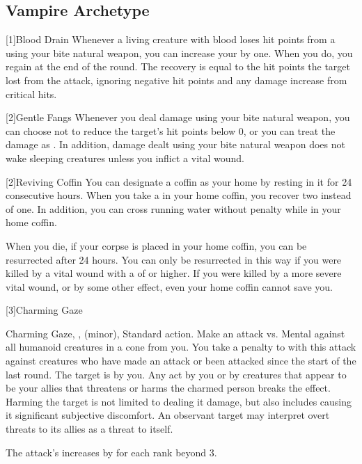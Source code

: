   \subsection{Vampire Archetype}

    [1]{Blood Drain} Whenever a living creature with blood loses hit points from a  using your bite natural weapon, you can increase your  by one.
      When you do, you regain  at the end of the round.
      The recovery is equal to the hit points the target lost from the attack, ignoring negative hit points and any damage increase from critical hits.

    [2]{Gentle Fangs} Whenever you deal damage using your bite natural weapon, you can choose not to reduce the target's hit points below 0, or you can treat the damage as .
      In addition, damage dealt using your bite natural weapon does not wake sleeping creatures unless you inflict a vital wound.

    [2]{Reviving Coffin} You can designate a coffin as your home by resting in it for 24 consecutive hours.
      When you take a  in your home coffin, you recover two  instead of one.
      In addition, you can cross running water without penalty while in your home coffin.

      When you die, if your corpse is placed in your home coffin, you can be resurrected after 24 hours.
      You can only be resurrected in this way if you were killed by a vital wound with a  of  or higher.
      If you were killed by a more severe vital wound, or by some other effect, even your home coffin cannot save you.

    [3]{Charming Gaze}
      \begin{magicalsustainability}{Charming Gaze}{, ,  (minor), }
        \abilityusagetime Standard action.
        \rankline
        Make an attack vs. Mental against all humanoid creatures in a \medarea cone from you.
        You take a  penalty to  with this attack against creatures who have made an attack or been attacked since the start of the last round.
        \hit The target is \charmed by you.
        Any act by you or by creatures that appear to be your allies that threatens or harms the charmed person breaks the effect.
        Harming the target is not limited to dealing it damage, but also includes causing it significant subjective discomfort.
        An observant target may interpret overt threats to its allies as a threat to itself.

        \rankline
        The attack's  increases by  for each rank beyond 3.
      \end{magicalsustainability}

